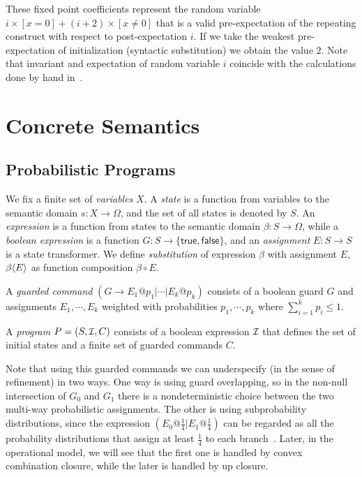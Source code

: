 \documentclass{eptcs}
\theoremstyle{plain}
\theoremstyle{definition}
\newcommand{\Vars}{X}
\newcommand{\Prg}{P}
\newcommand{\Init}{\mbox{\small\ensuremath{\mathcal{I}}}}
\newcommand{\CGs}{C}
\newcommand{\Subst}[2][]
	{ \ensuremath{\ifthenelse{\equal{#1}{}}{\langle #2 \rangle}{\langle #1\mapsto #2 \rangle} }}
\newcommand{\ra}{\ensuremath{\rightarrow}}
\newcommand{\True}[0]{\textsf{true}}
\newcommand{\False}[0]{\textsf{false}}
\newcommand{\remark}[2]{}
\newcommand{\remarkD}[1]{\remark{D}{#1}}
\begin{document}
These fixed point coefficients represent the random variable $i\times [x=0] + (i + 2) \times [x\neq0]$ that is a valid \mbox{pre-expectation} of the repeating construct with respect to post-expectation $i$.
If we take the weakest \mbox{pre-expectation} of initialization (syntactic substitution) we obtain the value $2$.
Note that invariant and expectation of random variable $i$ coincide with the calculations done by hand in~\cite{morgan04arp}.






\section{Concrete Semantics}\label{concrete_semantics}

\subsection{Probabilistic Programs}

We fix a finite set of \emph{variables} $\Vars$. A \emph{state} is a function from variables to the semantic domain $s:\Vars\ra \Omega$, and the set of all states is denoted by $S$.
An \emph{expression} is a function from states to the semantic domain $\beta: S \ra \Omega$, while a \emph{boolean expression} is a function $G:S\ra \{\True,\False\}$, and an \emph{assignment} $E:S\ra S$ is a state transformer.
We define \emph{substitution} of expression $\beta$ with assignment $E$, $\beta\Subst{E}$ as function composition $\beta\circ E$.

A \emph{guarded command} $(G \ra E_1@p_1 | \cdots | E_k@p_k)$ consists of a boolean guard $G$ and assignments $E_1,\cdots, E_k$ weighted with probabilities $p_1,\cdots, p_k$ where $\sum_{i=1}^k p_i \leq 1$.

A \emph{program} $\Prg = (S, \Init, \CGs)$ consists of a boolean expression $\Init$ that defines the set of initial states and a finite set of guarded commands $\CGs$.

Note that using this guarded commands we can underspecify (in the sense of refinement) in two ways.
One way is using guard overlapping, so in the non-null intersection of $G_0$ and $G_1$ there is a nondeterministic choice between the two multi-way probabilistic assignments.
The other is using subprobability distributions, since the expression $(E_0@\tfrac{1}{4} | E_1@\tfrac{1}{4})$ can be regarded as all the probability distributions that assign at least $\tfrac{1}{4}$ to each branch~\cite{josee09demonic}.
Later, in the operational model, we will see that the first one is handled by convex combination closure, while the later is handled by up closure.
\remarkD{Se podria dibujar el ejemplo primero como transys}
\end{document}
